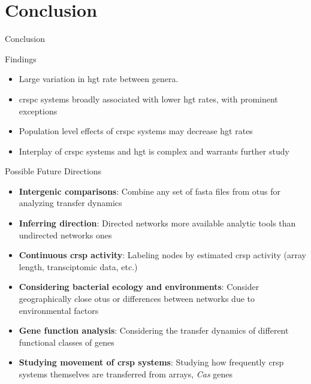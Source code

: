 \documentclass[dvipsnames]{beamer}
\begin{document}
\section{Conclusion}
\begin{frame}[fragile]{}%
    \begin{center}
        \Huge \textcolor{OliveGreen}{Conclusion}
    \end{center}
    \addtocounter{framenumber}{-1}
\end{frame}
\begin{frame}[fragile]{Findings}
    \begin{itemize}
        \item<2-> Large variation in \ac{hgt} rate between genera.
        \item<3-> \ac{crspc} systems broadly associated with lower \ac{hgt} rates, with prominent exceptions
        \item<4-> Population level effects of \ac{crspc} systems may decrease \ac{hgt} rates
        \item<5-> Interplay of \ac{crspc} systems  and \ac{hgt} is complex and warrants further study
    \end{itemize}
\end{frame}
\begin{frame}[fragile]{Possible Future Directions}
\begin{itemize}
    \item<2-> \textbf{Intergenic comparisons}: Combine any set of fasta files from \ac{otu}s for analyzing transfer dynamics
    \item<3-> \textbf{Inferring direction}: Directed networks more available analytic tools than undirected networks ones
    \item<4-> \textbf{Continuous \ac{crsp} activity}: Labeling nodes by estimated \ac{crsp} activity (array length, transciptomic data, etc.)
    \item<5-> \textbf{Considering bacterial ecology and environments}: Consider geographically close \ac{otu}s or differences between networks due to environmental factors
    \item<6-> \textbf{Gene function analysis}: Considering the transfer dynamics of different functional classes of genes
    \item<7-> \textbf{Studying movement of \ac{crsp} systems}: Studying how frequently \ac{crsp} systems themselves are transferred from arrays, \textit{Cas} genes
\end{itemize}
\end{frame}
\end{document}

